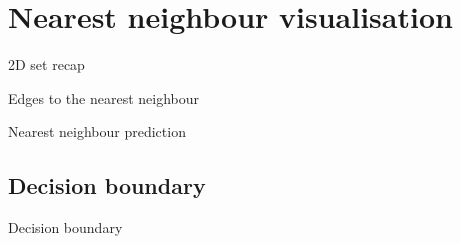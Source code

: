 \section{Nearest neighbour visualisation}

\begin{frame}{2D set recap}
\end{frame}

\begin{frame}{Edges to the nearest neighbour}
\end{frame}

\begin{frame}{Nearest neighbour prediction}
\end{frame}

\subsection{Decision boundary}

\begin{frame}{Decision boundary}
\end{frame}
